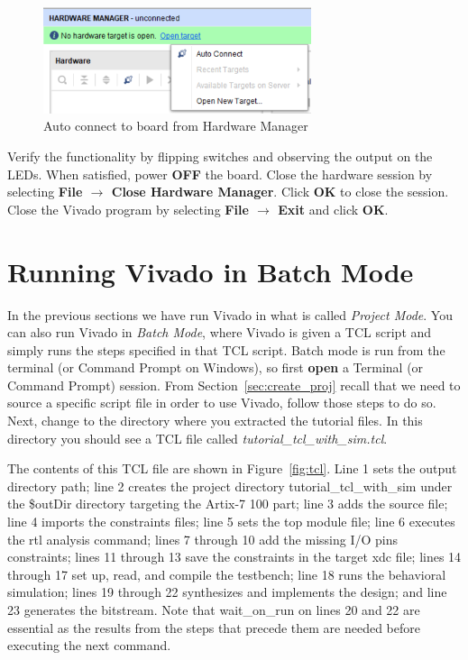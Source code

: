 \documentclass[11pt]{article}
\begin{document}
\begin{figure}[!h]
    \centering
    \includegraphics[width=0.7\textwidth]{images/auto_connect.png}
    \caption{Auto connect to board from Hardware Manager}
    \label{fig:auto_connect}
\end{figure}

Verify the functionality by flipping switches and observing the output on the LEDs. When satisfied, power \textbf{OFF} the board. Close the hardware session by selecting \textbf{File $\rightarrow$ Close Hardware Manager}. Click \textbf{OK} to close the session. Close the Vivado program by selecting \textbf{File $\rightarrow$ Exit} and click \textbf{OK}.




\section{Running Vivado in Batch Mode} 
\label{sec:batch_mode}
In the previous sections we have run Vivado in what is called \textit{Project Mode}. You can also run Vivado in \textit{Batch Mode}, where Vivado is given a TCL script and simply runs the steps specified in that TCL script. Batch mode is run from the terminal (or Command Prompt on Windows), so first \textbf{open} a Terminal (or Command Prompt) session. From Section~\ref{sec:create_proj} recall that we need to source a specific script file in order to use Vivado, follow those steps to do so. Next, change to the directory where you extracted the tutorial files. In this directory you should see a TCL file called \textit{tutorial\_tcl\_with\_sim.tcl}. 

The contents of this TCL file are shown in Figure~\ref{fig:tcl}. Line 1 sets the output directory path; line 2 creates the project directory tutorial\_tcl\_with\_sim under the \$outDir directory targeting the Artix-7 100 part; line 3 adds the source file; line 4 imports the constraints files; line 5 sets the top module file; line 6 executes the rtl analysis command; lines 7 through 10 add the missing I/O pins constraints; lines 11 through 13 save the constraints in the target xdc file; lines 14 through 17 set up, read, and compile the testbench; line 18 runs the behavioral simulation; lines 19 through 22 synthesizes and implements the design; and line 23 generates the bitstream. Note that wait\_on\_run on lines 20 and 22 are essential as the results from the steps that precede them are needed before executing the next command.
\end{document}

